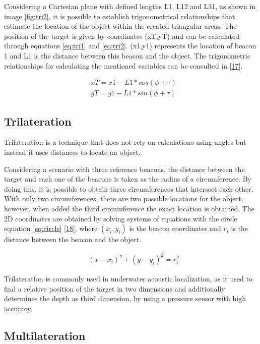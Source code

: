 Considering a Cartesian plane with defined lengths L1, L12 and L31, as shown in image \ref{fig:tri2}, it is possible to establish trigonometrical relationships that estimate the location of the object within the created triangular areas. The position of the target is given by coordinates (xT,yT) and can be calculated through equations \ref{eq:tri1} and \ref{eq:tri2}. (x1,y1) represents the location of beacon 1 and L1 is the distance between this beacon and the object. The trigonometric relationships for calculating the mentioned variables can be consulted in [\hyperref[r:r17]{17}].

\begin{eqnarray}
& xT = x1 - L1 * cos(\phi + \tau)
\label{eq:tri1}\\
& yT = y1 - L1 * sin(\phi + \tau)
\label{eq:tri2}
\end{eqnarray}

\subsection{Trilateration}

Trilateration is a technique that does not rely on calculations using angles but instead it uses distances to locate an object.

Considering a scenario with three reference beacons, the distance between the target and each one of the beacons is taken as the radius of a circumference. By doing this, it is possible to obtain three circumferences that intersect each other. With only two circumferences, there are two possible locations for the object, however, when added the third circumference the exact location is obtained. The 2D coordinates are obtained by solving systems of equations with the circle equation \ref{eq:circle} [\hyperref[r:r18]{18}], where $(x_{i}, y_{i})$ is the beacon coordinates and $r_{i}$ is the distance between the beacon and the object.

\begin{eqnarray}
& (x - x_{i})^2 + (y - y_{i})^2 = r_{i}^2 
\label{eq:circle}
\end{eqnarray}

Trilateration is commonly used in underwater acoustic localization, as it used to find a relative position of the target in two dimensions and additionally determines the depth as third dimension, by using a pressure sensor with high accuracy.

\subsection{Multilateration}

